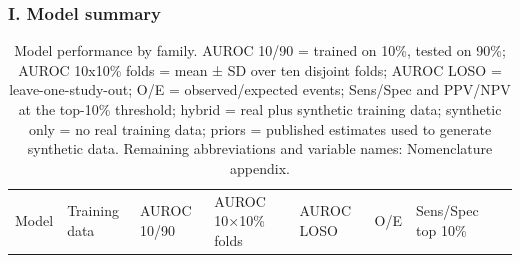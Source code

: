 \documentclass[
  11pt,
]{article}
\begin{document}
\subsubsection{I. Model summary}\label{i.-model-summary}

\begin{longtable}[]{@{}
  >{\raggedright\arraybackslash}p{}
  >{\raggedright\arraybackslash}p{}
  >{\raggedright\arraybackslash}p{}
  >{\raggedright\arraybackslash}p{}
  >{\raggedright\arraybackslash}p{}
  >{\raggedright\arraybackslash}p{}
  >{\raggedright\arraybackslash}p{}
  >{\raggedright\arraybackslash}p{}@{}}
\caption{Model performance by family. AUROC 10/90 = trained on 10\%,
tested on 90\%; AUROC 10x10\% folds = mean ± SD over ten disjoint folds;
AUROC LOSO = leave-one-study-out; O/E = observed/expected events;
Sens/Spec and PPV/NPV at the top-10\% threshold; hybrid = real plus
synthetic training data; synthetic only = no real training data; priors
= published estimates used to generate synthetic data. Remaining
abbreviations and variable names: Nomenclature appendix.}\tabularnewline
\toprule\noalign{}
\begin{minipage}[b]{\linewidth}\raggedright
Model
\end{minipage} & \begin{minipage}[b]{\linewidth}\raggedright
Training data
\end{minipage} & \begin{minipage}[b]{\linewidth}\raggedright
AUROC 10/90
\end{minipage} & \begin{minipage}[b]{\linewidth}\raggedright
AUROC 10×10\% folds
\end{minipage} & \begin{minipage}[b]{\linewidth}\raggedright
AUROC LOSO
\end{minipage} & \begin{minipage}[b]{\linewidth}\raggedright
O/E
\end{minipage} & \begin{minipage}[b]{\linewidth}\raggedright
Sens/Spec top 10\%
\end{minipage} & \begin{minipage}[b]{\linewidth}\raggedright

\end{minipage}
\end{longtable}
\end{document}
